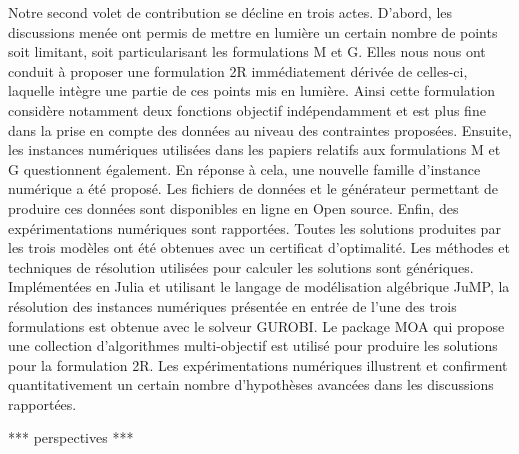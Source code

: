 \documentclass[preprint,12pt,authoryear]{elsarticle}
\begin{document}
Notre second volet de contribution se décline en trois actes.
%
D'abord,  les discussions menée ont permis de mettre en lumière un certain nombre de points soit limitant, soit particularisant les formulations M et G.
Elles nous nous ont conduit à proposer une formulation 2R immédiatement dérivée de celles-ci, laquelle intègre une partie de ces points mis en lumière.
Ainsi cette formulation considère notamment deux fonctions objectif indépendamment et est plus fine dans la prise en compte des données au niveau des contraintes proposées.
%
Ensuite, les instances numériques utilisées dans les papiers relatifs aux formulations M et G questionnent également.
En réponse à cela, une nouvelle famille d’instance numérique a été proposé. Les fichiers de données et le générateur permettant de produire ces données sont disponibles en ligne en Open source.
%
Enfin, des expérimentations numériques sont rapportées.
Toutes les solutions produites par les trois modèles ont été obtenues avec un certificat d’optimalité.
Les méthodes et techniques de résolution utilisées pour calculer les solutions sont génériques. 
Implémentées en Julia et utilisant le langage de modélisation algébrique JuMP, la résolution des instances numériques présentée en entrée de l'une des trois formulations est obtenue avec le solveur GUROBI. Le package MOA qui propose une collection d'algorithmes multi-objectif est utilisé pour produire les solutions pour la formulation 2R. 
%
Les expérimentations numériques illustrent et confirment quantitativement un certain nombre d’hypothèses avancées dans les discussions rapportées.

*** perspectives ***
\color{black}
\end{document}
